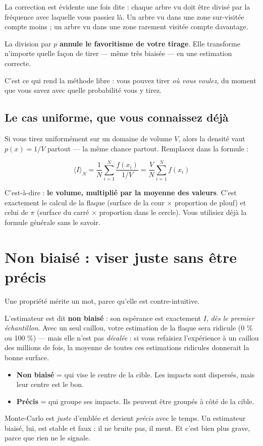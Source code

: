 La correction est évidente une fois dite : chaque arbre vu doit être divisé par
la fréquence avec laquelle vous passiez là. Un arbre vu dans une zone
sur-visitée compte moins ; un arbre vu dans une zone rarement visitée compte
davantage.

\begin{nkretenir}[Le rôle de $p$]
La division par $p$ \textbf{annule le favoritisme de votre tirage}. Elle
transforme n'importe quelle façon de tirer — même très biaisée — en une
estimation correcte.

C'est ce qui rend la méthode libre : vous pouvez tirer \emph{où vous voulez},
du moment que vous savez avec quelle probabilité vous y tirez.
\end{nkretenir}

\subsection{Le cas uniforme, que vous connaissez déjà}

Si vous tirez uniformément sur un domaine de volume $V$, alors la densité vaut
$p(x) = 1/V$ partout — la même chance partout. Remplacez dans la formule :

\[ \langle I \rangle_N = \frac{1}{N}\sum_{i=1}^{N} \frac{f(x_i)}{1/V}
   = \frac{V}{N}\sum_{i=1}^{N} f(x_i) \]

C'est-à-dire : \textbf{le volume, multiplié par la moyenne des valeurs}. C'est
exactement le calcul de la flaque (surface de la cour $\times$ proportion de
plouf) et celui de $\pi$ (surface du carré $\times$ proportion dans le cercle).
Vous utilisiez déjà la formule générale sans le savoir.

\section{Non biaisé : viser juste sans être précis}

Une propriété mérite un mot, parce qu'elle est contre-intuitive.

L'estimateur est dit \textbf{non biaisé} : son espérance est exactement $I$,
\emph{dès le premier échantillon}. Avec un seul caillou, votre estimation de la
flaque sera ridicule (0 \% ou 100 \%) — mais elle n'est pas \emph{décalée} :
si vous refaisiez l'expérience à un caillou des millions de fois, la moyenne de
toutes ces estimations ridicules donnerait la bonne surface.

\begin{nkretenir}
\begin{itemize}
  \item \textbf{Non biaisé} = qui vise le centre de la cible. Les impacts sont
        dispersés, mais leur centre est le bon.
  \item \textbf{Précis} = qui groupe ses impacts. Ils peuvent être groupés à
        côté de la cible.
\end{itemize}
Monte-Carlo est \emph{juste} d'emblée et devient \emph{précis} avec le temps.
Un estimateur biaisé, lui, est stable et faux : il ne bruite pas, il ment. Et
c'est bien plus grave, parce que rien ne le signale.
\end{nkretenir}

